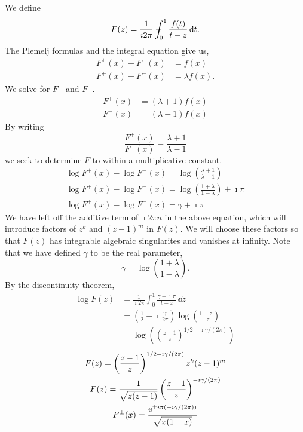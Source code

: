 \begin{Solution}
  We define
  \[
  F(z) = \frac{1}{\imath 2 \pi} - \negthickspace \negthickspace \negthickspace \negmedspace\int_0^1 \frac{f(t)}{t-z}\,\mathrm{d} t.
  \]
  The Plemelj formulas and the integral equation give us,
  \begin{align*}
    F^+(x) - F^-(x) &= f(x) \\
    F^+(x) + F^-(x) &= \lambda f(x).
  \end{align*}
  We solve for $F^+$ and $F^-$.
  \begin{align*}
    F^+(x) &= (\lambda+1) f(x) \\
    F^-(x) &= (\lambda-1) f(x) 
  \end{align*}
  By writing
  \[
  \frac{ F^+(x) }{ F^-(x) } = \frac{\lambda+1}{\lambda-1}
  \]
  we seek to determine $F$ to within a multiplicative constant.
  \begin{gather*}
    \log F^+(x) - \log F^-(x) = \log \left( \frac{\lambda+1}{\lambda-1} \right) \\
    \log F^+(x) - \log F^-(x) 
    = \log \left( \frac{1 + \lambda}{1 - \lambda} \right) + \imath \pi \\
    \log F^+(x) - \log F^-(x) = \gamma + \imath \pi 
  \end{gather*}
  We have left off the additive term of $\imath 2 \pi n$ in the above equation, which
  will introduce factors of $z^k$ and $(z-1)^m$ in $F(z)$.  We will choose 
  these factors so that $F(z)$ has integrable algebraic singularites and 
  vanishes at infinity.  Note that we have defined $\gamma$ to be the real 
  parameter,
  \[
  \gamma = \log \left( \frac{1 + \lambda}{1 - \lambda} \right).
  \]
  By the discontinuity theorem,
  \begin{align*}
    \log F(z)
    &= \frac{1}{\imath 2 \pi} \int_0^1 \frac{\gamma + \imath \pi}{t-z}\,\dd z \\
    &= \left( \frac{1}{2} - \imath \frac{ \gamma }{2 \pi} \right)
    \log \left( \frac{1-z}{-z} \right) \\
    &= \log \left( \left( \frac{z-1}{z} \right)^{1/2 - \imath \gamma / (2\pi)}
    \right) 
  \end{align*}
  \begin{gather*}
    F(z) = \left( \frac{z-1}{z} \right)^{1/2 - \imath \gamma / (2\pi)} z^k (z-1)^m \\
    F(z) = \frac{1}{\sqrt{z(z-1)}} 
    \left( \frac{z-1}{z} \right)^{- \imath \gamma / (2\pi)} \\
    F^\pm(x) = \frac{\e^{\pm \imath \pi (-\imath \gamma/(2\pi))}}{\sqrt{x(1-x)}} 

\end{gather*}
\end{Solution}
